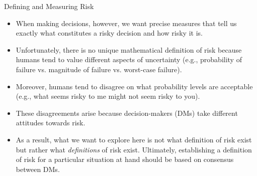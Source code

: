 \documentclass[9pt]{beamer}
\begin{document}
%
\begin{frame}{Defining and Measuring Risk}

\begin{itemize}

\item When making decisions, however, we want precise measures that tell us exactly what constitutes a risky decision and how risky it is. 

\item Unfortunately, there is no unique mathematical definition of risk because humans tend to value different aspects of  uncertainty (e.g., probability of failure vs. magnitude of failure vs. worst-case failure).  

\item Moreover, humans tend to disagree on what probability levels are acceptable (e.g., what seems risky to me might not seem risky to you).

\item These disagreements arise because decision-makers (DMs) take different attitudes towards risk. 

\item As a result, what we want to explore here is not what definition of risk exist but rather what {\em definitions} of risk exist. Ultimately, establishing a definition of risk for a particular situation at hand should be based on consensus between DMs. 

\end{itemize}

\end{frame}
\end{document}
